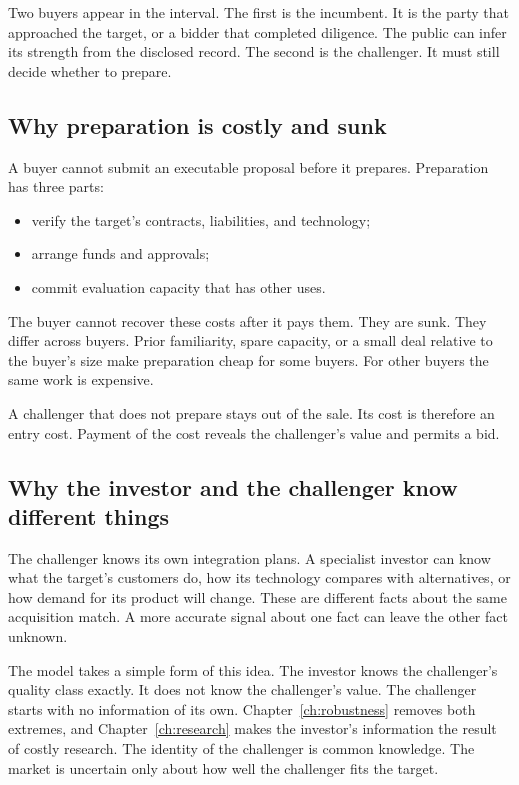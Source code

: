 Two buyers appear in the interval.
The first is the incumbent. It is the party that approached the target, or a bidder that completed diligence.
The public can infer its strength from the disclosed record.
The second is the challenger. It must still decide whether to prepare.

\subsection*{Why preparation is costly and sunk}

A buyer cannot submit an executable proposal before it prepares.
Preparation has three parts:
\begin{itemize}
\item verify the target's contracts, liabilities, and technology;
\item arrange funds and approvals;
\item commit evaluation capacity that has other uses.
\end{itemize}
The buyer cannot recover these costs after it pays them. They are sunk.
They differ across buyers.
Prior familiarity, spare capacity, or a small deal relative to the buyer's size make preparation cheap for some buyers.
For other buyers the same work is expensive.

A challenger that does not prepare stays out of the sale.
Its cost is therefore an entry cost. Payment of the cost reveals the challenger's value and permits a bid.

\subsection*{Why the investor and the challenger know different things}

The challenger knows its own integration plans.
A specialist investor can know what the target's customers do, how its technology compares with alternatives, or how demand for its product will change.
These are different facts about the same acquisition match.
A more accurate signal about one fact can leave the other fact unknown.

The model takes a simple form of this idea.
The investor knows the challenger's quality class exactly. It does not know the challenger's value.
The challenger starts with no information of its own.
Chapter~\ref{ch:robustness} removes both extremes, and Chapter~\ref{ch:research} makes the investor's information the result of costly research.
The identity of the challenger is common knowledge. The market is uncertain only about how well the challenger fits the target.

